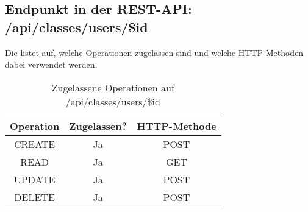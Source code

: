 \subsection{Endpunkt in der REST-API: /api/classes/users/\$id}
Die  listet auf, welche Operationen zugelassen sind und welche HTTP-Methoden dabei verwendet werden. 

\begin{table}[!htbp]
	\begin{tabular}{|c|c|c|}
		\hline
			\textbf{Operation} & \textbf{Zugelassen?} & \textbf{HTTP-Methode} \\ \hline
			CREATE & Ja & POST \\ \hline 
			READ & Ja & GET \\ \hline
			UPDATE & Ja & POST \\ \hline 
			DELETE & Ja & POST \\ \hline
	\end{tabular}

		\caption{Zugelassene Operationen auf /api/classes/users/\$id}
		\label{tab:end:rest:api:classes:users:id:meth}
\end{table}